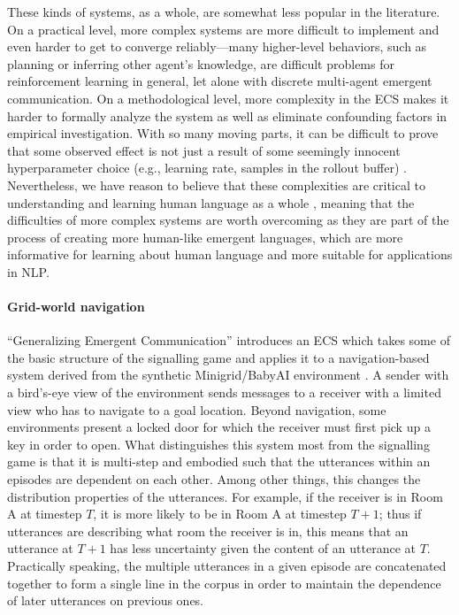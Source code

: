 These kinds of systems, as a whole, are somewhat less popular in the literature.
On a practical level, more complex systems are more difficult to implement and even harder to get to converge reliably---many higher-level behaviors, such as planning or inferring other agent's knowledge, are difficult problems for reinforcement learning in general, let alone with discrete multi-agent emergent communication.
On a methodological level, more complexity in the ECS makes it harder to formally analyze the system as well as eliminate confounding factors in empirical investigation.
With so many moving parts, it can be difficult to prove that some observed effect is not just a result of some seemingly innocent hyperparameter choice (e.g., learning rate, samples in the rollout buffer) \citep{boldt2022MathematicallyMT}.
Nevertheless, we have reason to believe that these complexities are critical to understanding and learning human language as a whole \citep{bisk-etal-2020-experience}, meaning that the difficulties of more complex systems are worth overcoming as they are part of the process of creating more human-like emergent languages, which are more informative for learning about human language and more suitable for applications in NLP\@.


\paragraph{Grid-world navigation}
``Generalizing Emergent Communication'' \citep[BSD-3-clause license]{unger2020GeneralizingEC} introduces an ECS which takes some of the basic structure of the signalling game and applies it to a navigation-based system derived from the synthetic Minigrid/BabyAI environment \citep{chevalier2018babyai,MinigridMiniworld23}.
A sender with a bird's-eye view of the environment sends messages to a receiver with a limited view who has to navigate to a goal location.
Beyond navigation, some environments present a locked door for which the receiver must first pick up a key in order to open.
What distinguishes this system most from the signalling game is that it is multi-step and embodied such that the  utterances within an episodes are dependent on each other.
Among other things, this changes the distribution properties of the utterances.
For example, if the receiver is in Room A at timestep $T$, it is more likely to be in Room A at timestep $T+1$; thus if utterances are describing what room the receiver is in, this means that an utterance at $T+1$ has less uncertainty given the content of an utterance at $T$.
Practically speaking, the multiple utterances in a given episode are concatenated together to form a single line in the corpus in order to maintain the dependence of later utterances on previous ones.

